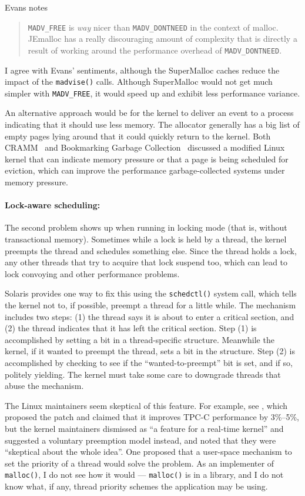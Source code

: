 \documentclass[natbib,sort&compress,10pt]{sigplanconf}
\newcommand{\code}[1]{\texttt{#1}}
\begin{document}
Evans notes \cite{Evans12}
\begin{quote}
 \code{MADV\_FREE} is \textit{way} nicer than \code{MADV\_DONTNEED} in
 the context of malloc.  JEmalloc has a really discouraging amount of
 complexity that is directly a result of working around the
 performance overhead of \code{MADV\_DONTNEED}.
\end{quote}
I agree with Evans' sentiments, although the SuperMalloc caches reduce
the impact of the \code{madvise()} calls.  Although SuperMalloc would
not get much simpler with \code{MADV\_FREE}, it would speed up and
exhibit less performance variance.

An alternative approach would be for the kernel to deliver an event to
a process indicating that it should use less memory.  The allocator
generally has a big list of empty pages lying around that it could
quickly return to the kernel.  Both CRAMM~\cite{YangBeKa06} and
Bookmarking Garbage Collection~\cite{HertzFeBe05} discussed a
modified Linux kernel that can indicate memory pressure or that a page
is being scheduled for eviction, which can improve the performance
garbage-collected systems under memory pressure.

{\paragraph{Lock-aware scheduling:}} The second problem shows up when
running in locking mode (that is, without transactional
memory).  Sometimes while a lock is held by a thread, the kernel
preempts the thread and schedules something else.  Since the thread
holds a lock, any other threads that try to acquire that lock suspend
too, which can lead to lock convoying and other performance problems.

Solaris provides one way to fix this using the \code{schedctl()}
system call, which tells the kernel not to, if possible, preempt a
thread for a little while\cite{Dice11}.  The mechanism includes two
steps: (1) the thread says it is about to enter a critical section,
and (2) the thread indicates that it has left the critical section.
Step (1) is accomplished by setting a bit in a thread-specific
structure.  Meanwhile the kernel, if it wanted to preempt the thread,
sets a bit in the structure.  Step (2) is accomplished by checking to
see if the ``wanted-to-preempt'' bit is set, and if so, politely
yielding.  The kernel must take some care to downgrade threads that
abuse the mechanism.

The Linux maintainers seem skeptical of this feature.  For example,
see \cite{Aziz14}, which proposed the patch and claimed that it
improves TPC-C performance by 3\%--5\%, but the kernel maintainers
dismissed as ``a feature for a real-time kernel'' and suggested a
voluntary preemption model instead, and noted that they were
``skeptical about the whole idea''.  One proposed \cite{Oboguev14a,
  Oboguev14b} that a user-space mechanism to set the priority of a
thread would solve the problem.  As an implementer of \code{malloc()},
I do not see how it would --- \code{malloc()} is in a library, and I
do not know what, if any, thread priority schemes the application may
be using.
\end{document}
